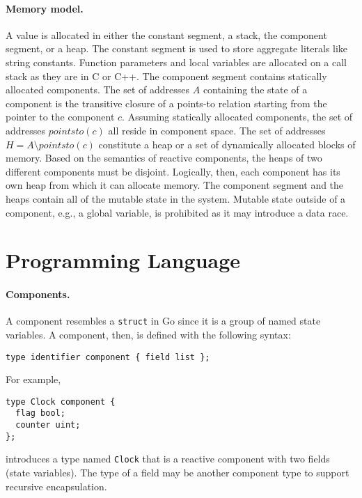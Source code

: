 \paragraph{Memory model.}
A value is allocated in either the constant segment, a stack, the component segment, or a heap.
The constant segment is used to store aggregate literals like string constants.
Function parameters and local variables are allocated on a call stack as they are in C or C++.
The component segment contains statically allocated components.
The set of addresses $A$ containing the state of a component is the transitive closure of a points-to relation starting from the pointer to the component $c$.
Assuming statically allocated components, the set of addresses $pointsto(c)$ all reside in component space.
The set of addresses $H = A \setminus pointsto(c)$ constitute a heap or a set of dynamically allocated blocks of memory.
Based on the semantics of reactive components, the heaps of two different components must be disjoint.
Logically, then, each component has its own heap from which it can allocate memory.
The component segment and the heaps contain all of the mutable state in the system.
Mutable state outside of a component, e.g., a global variable, is prohibited as it may introduce a data race.

\section{Programming Language}

\paragraph{Components.}
A component resembles a \verb+struct+ in Go since it is a group of named state variables.
A component, then, is defined with the following syntax:
\begin{verbatim}
type identifier component { field list };
\end{verbatim}
For example,
\begin{verbatim}
type Clock component {
  flag bool;
  counter uint;
};
\end{verbatim}
introduces a type named \verb+Clock+ that is a reactive component with two fields (state variables).
The type of a field may be another component type to support recursive encapsulation.

